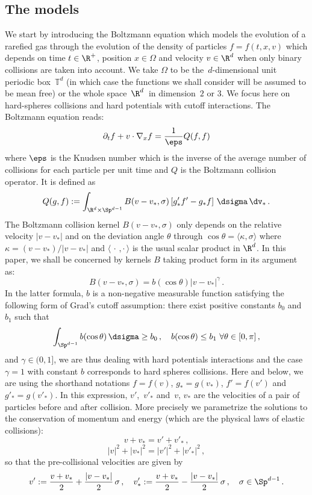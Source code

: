 \subsection{The models}
We start by introducing the Boltzmann equation which models the evolution of a rarefied gas through the evolution of the density of particles $f=f(t,x,v)$ which depends on time $t \in \R^+$, position $x \in \Omega$ and velocity $v \in \R^d$ when only binary collisions are taken into account. We take $\Omega $ to be the~$d$-dimensional unit periodic box~${\mathbb T}^d$ (in which case the functions we shall consider will be assumed to be mean free) or the whole space~$ \R^d$~in dimension~$2$ or $3$. We focus here on hard-spheres collisions and hard potentials with cutoff interactions. The Boltzmann equation reads:
\[
\partial_t f + v \cdot \nabla_x f = \frac{1}{\eps} Q(f,f)
\]
where $\eps$ is the Knudsen number which is the inverse of the average number of collisions for each particle per unit time and $Q$ is the Boltzmann collision operator. It is defined as
\[
Q(g,f):=\int_{\R^d \times \Sp^{d-1}} B(v-v_*,\sigma) \left[g'_*f' - g_* f \right] \, \dsigma \, \dv_* \,.
\]
The Boltzmann collision kernel $B(v-v_*,\sigma)$ only depends on the relative velocity $|v-v_*|$ and on the deviation angle $\theta$ through $\cos \theta = \langle \kappa, \sigma \rangle$ where $\kappa = (v-v_*)/|v-v_*|$ and $\langle {\,\cdot\,, \cdot\,} \rangle$ is the usual scalar product in $\R^d$. In this paper, we shall be concerned by kernels $B$ taking product form in its argument as:
\[
B(v-v_*,\sigma) = b(\cos \theta) |v-v_*|^\gamma \,.
\]
In the latter formula, $b$ is a non-negative measurable function satisfying the following form of Grad's cutoff assumption: there exist positive constants $b_0$ and $b_1$ such that
\[
\int_{\Sp^{d-1}} b(\cos \theta) \, \dsigma \ge b_0\,, \quad b(\cos \theta) \le b_1 \, \, \forall \theta \in [0,\pi] \,,
\]
and $\gamma \in (0,1]$, we are thus dealing with hard potentials interactions and the case~$\gamma =1$ with constant $b$ corresponds to hard spheres collisions. Here and below, we are using the shorthand notations $f=f(v)$, $g_*=g(v_*)$, $f'=f(v')$ and $g'_*=g(v'_*)$. In this expression, $v'$,~$v'_*$ and~$v$, $v_*$ are the velocities of a pair of particles before and after collision. More precisely we parametrize the solutions to the conservation of momentum and energy (which are the physical laws of elastic collisions):
\[
v+v_*=v'+v'_* \,,
\]
\[
|v|^2+|v_*|^2=|v'|^2+ |v'_*|^2\,,
\]
so that the pre-collisional velocities are given by
\[
v':=\frac{v+v_*}{2} + \frac{|v-v_*|}{2}\, \sigma \,, \quad v'_*:=\frac{v+v_*}{2} - \frac{|v-v_*|}{2}\, \sigma\,, \quad \sigma \in \Sp^{d-1} \,.
\]
